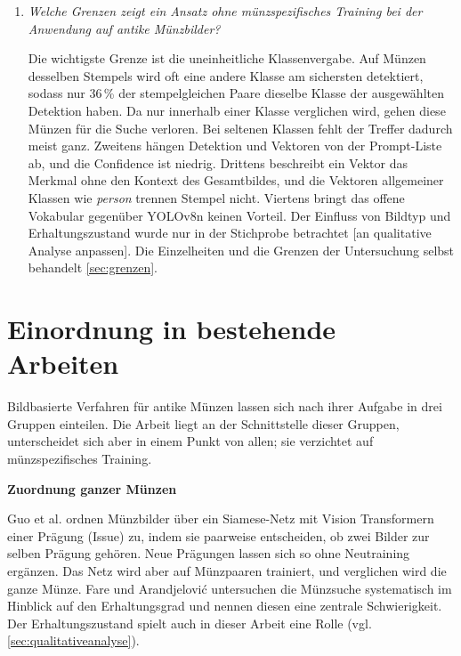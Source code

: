 \begin{enumerate}
    \item \textit{Welche Grenzen zeigt ein Ansatz ohne münzspezifisches Training bei der Anwendung auf antike Münzbilder?}
 
    \noindent Die wichtigste Grenze ist die uneinheitliche Klassenvergabe. Auf Münzen desselben Stempels wird oft eine andere Klasse am sichersten detektiert, sodass nur 36\,\% der stempelgleichen Paare dieselbe Klasse der ausgewählten Detektion haben. Da nur innerhalb einer Klasse verglichen wird, gehen diese Münzen für die Suche verloren. Bei seltenen Klassen fehlt der Treffer dadurch meist ganz. Zweitens hängen Detektion und Vektoren von der Prompt-Liste ab, und die Confidence ist niedrig. Drittens beschreibt ein Vektor das Merkmal ohne den Kontext des Gesamtbildes, und die Vektoren allgemeiner Klassen wie \textit{person} trennen Stempel nicht. Viertens bringt das offene Vokabular gegenüber YOLOv8n keinen Vorteil. Der Einfluss von Bildtyp und Erhaltungszustand wurde nur in der Stichprobe betrachtet [an qualitative Analyse anpassen]. Die Einzelheiten und die Grenzen der Untersuchung selbst behandelt \cref{sec:grenzen}.
\end{enumerate}


\section{Einordnung in bestehende Arbeiten}
\label{sec:bestehendearbeiten}
Bildbasierte Verfahren für antike Münzen lassen sich nach ihrer Aufgabe in drei Gruppen einteilen. Die Arbeit liegt an der Schnittstelle dieser Gruppen, unterscheidet sich aber in einem Punkt von allen; sie verzichtet auf münzspezifisches Training.

\vspace{\baselineskip}

\noindent \textbf{Zuordnung ganzer Münzen} 

\noindent Guo et al. \cite{guo2023siamese} ordnen Münzbilder über ein Siamese-Netz mit Vision Transformern einer Prägung (Issue) zu, indem sie paarweise entscheiden, ob zwei Bilder zur selben Prägung gehören. Neue Prägungen lassen sich so ohne Neutraining ergänzen. Das Netz wird aber auf Münzpaaren trainiert, und verglichen wird die ganze Münze. Fare und Arandjelović \cite{fare2017ancient} untersuchen die Münzsuche systematisch im Hinblick auf den Erhaltungsgrad und nennen diesen eine zentrale Schwierigkeit. Der Erhaltungszustand spielt auch in dieser Arbeit eine Rolle (vgl. \cref{sec:qualitativeanalyse}).


